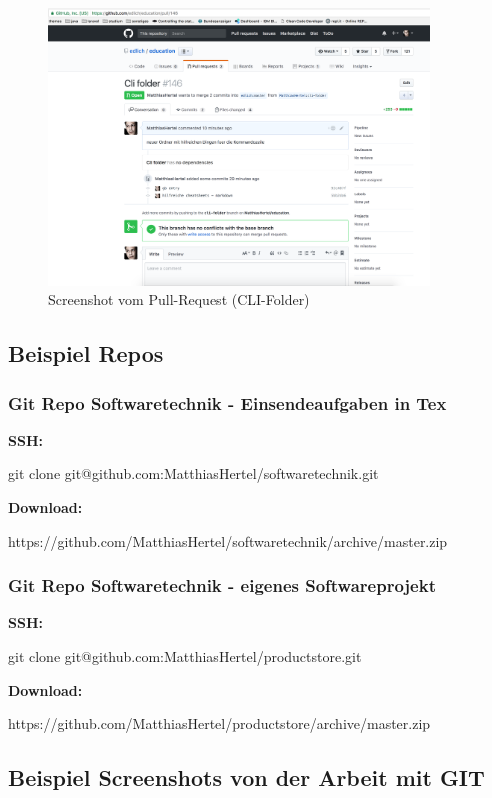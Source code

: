 \documentclass[12pt]{article}
\begin{document}
\begin{figure}[H]
  \centering
  \includegraphics[width=0.9\textwidth]{./img/pull_request.png}
  \captionsetup{name=Abb.,font=footnotesize}
  \caption{Screenshot vom Pull-Request (CLI-Folder)}
\end{figure}

\newpage
\subsection{Beispiel Repos}
\subsubsection{Git Repo Softwaretechnik - Einsendeaufgaben in Tex}

\textbf{SSH:}

git clone git@github.com:MatthiasHertel/softwaretechnik.git


\textbf{Download:}

https://github.com/MatthiasHertel/softwaretechnik/archive/master.zip

\subsubsection{Git Repo Softwaretechnik - eigenes Softwareprojekt}

\textbf{SSH:}

git clone git@github.com:MatthiasHertel/productstore.git


\textbf{Download:}

https://github.com/MatthiasHertel/productstore/archive/master.zip


\newpage
\subsection{Beispiel Screenshots von der Arbeit mit GIT}
\end{document}
